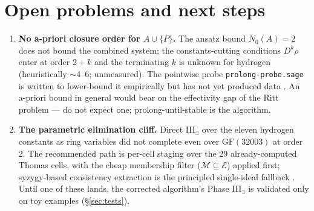 \documentclass[11pt]{article}
\newcommand{\Mem}{\mathcal{M}}
\newcommand{\Ex}{\mathcal{E}}
\newcommand{\code}[1]{\texttt{#1}}
\begin{document}
\section{Open problems and next steps}
\label{sec:open}

\begin{enumerate}
\item \textbf{No a-priori closure order for $A\cup\{P\}$.} The ansatz bound
  $N_0(A)=2$ does not bound the combined system; the constants-cutting
  conditions $D^k\rho$ enter at order $2+k$ and the terminating $k$ is
  unknown for hydrogen (heuristically $\sim$4--6; unmeasured). The pointwise
  probe \code{prolong-probe.sage} is written to lower-bound it empirically
  but has not yet produced data \cite{existence-route-report}. An a-priori
  bound in general would bear on the effectivity gap of the Ritt problem
  \cite{GKO2008,GKO2009} --- do not expect one; prolong-until-stable is the
  algorithm.
\item \textbf{The parametric elimination cliff.} Direct III$_\exists$ over
  the eleven hydrogen constants as ring variables did not complete even over
  $\mathrm{GF}(32003)$ at order 2. The recommended path is per-cell staging
  over the 29 already-computed Thomas cells, with the cheap membership
  filter ($\Mem \subseteq \Ex$) applied first; syzygy-based consistency
  extraction is the principled single-ideal fallback
  \cite{existence-route-report}. Until one of these lands, the corrected
  algorithm's Phase III$_\exists$ is validated only on toy examples
  (\S\ref{sec:tests}).


\end{enumerate}
\end{document}
